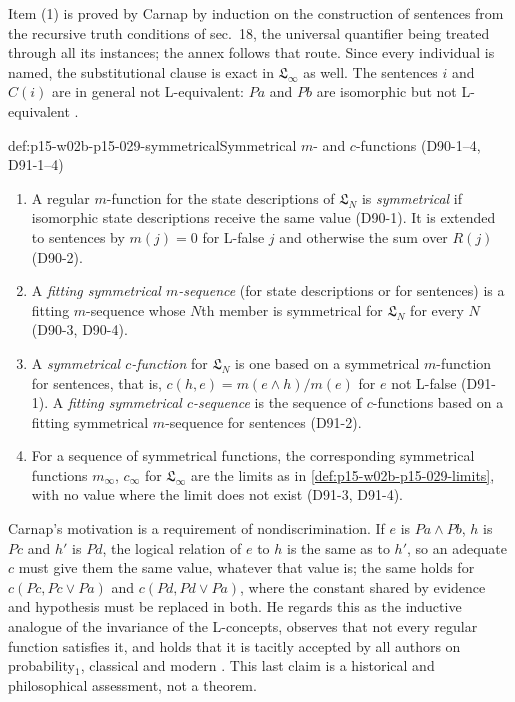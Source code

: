 Item (1) is proved by Carnap by induction on the construction of
sentences from the recursive truth conditions of sec.~18, the
universal quantifier being treated through all its instances; the
annex follows that route. Since every individual is named, the
substitutional clause is exact in \(\mathfrak L_\infty\) as well. The
sentences \(i\) and \(C(i)\) are in general not L-equivalent: \(Pa\) and
\(Pb\) are isomorphic but not L-equivalent \cite[T26-2 and the
remark following it, pp.~110--111]{Carnap1950Probability}.

\begin{hbdefinition}{def:p15-w02b-p15-029-symmetrical}{Symmetrical \(m\)- and \(c\)-functions (D90-1--4, D91-1--4)}
\begin{enumerate}
 \item A regular \(m\)-function for the state descriptions of
       \(\mathfrak L_N\) is \emph{symmetrical} if isomorphic state
       descriptions receive the same value (D90-1). It is extended to
       sentences by \(m(j)=0\) for L-false \(j\) and otherwise the sum
       over \(R(j)\) (D90-2).
 \item A \emph{fitting symmetrical \(m\)-sequence} (for state
       descriptions or for sentences) is a fitting \(m\)-sequence whose
       \(N\)th member is symmetrical for \(\mathfrak L_N\) for every
       \(N\) (D90-3, D90-4).
 \item A \emph{symmetrical \(c\)-function} for \(\mathfrak L_N\) is one
       based on a symmetrical \(m\)-function for sentences, that is,
       \(c(h,e)=m(e\land h)/m(e)\) for \(e\) not L-false (D91-1). A
       \emph{fitting symmetrical \(c\)-sequence} is the sequence of
       \(c\)-functions based on a fitting symmetrical \(m\)-sequence for
       sentences (D91-2).
 \item For a sequence of symmetrical functions, the corresponding
       symmetrical functions \(m_\infty\), \(c_\infty\) for
       \(\mathfrak L_\infty\) are the limits as in
       \cref{def:p15-w02b-p15-029-limits}, with no value where the limit
       does not exist (D91-3, D91-4).
\end{enumerate}
\end{hbdefinition}

Carnap's motivation is a requirement of nondiscrimination. If
\(e\) is \(Pa\land Pb\), \(h\) is \(Pc\) and \(h'\) is \(Pd\), the
logical relation of \(e\) to \(h\) is the same as to \(h'\), so an
adequate \(c\) must give them the same value, whatever that value is;
the same holds for \(c(Pc,Pc\lor Pa)\) and \(c(Pd,Pd\lor Pa)\), where
the constant shared by evidence and hypothesis must be replaced in both.
He regards this as the inductive analogue of the invariance of the
L-concepts, observes that not every regular function satisfies it, and
holds that it is tacitly accepted by all authors on
probability\(_1\), classical and modern \cite[sec.~90, pp.~484--485;
sec.~91, pp.~488--489]{Carnap1950Probability}. This last claim is a
historical and philosophical assessment, not a theorem.

